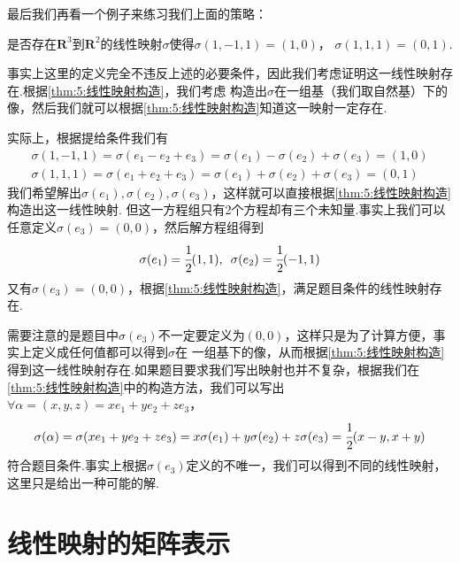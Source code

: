 最后我们再看一个例子来练习我们上面的策略：
\begin{example}\label{ex:5:线性映射判断2}
    是否存在$\mathbf{R}^3$到$\mathbf{R}^2$的线性映射$\sigma$使得$\sigma(1,-1,1)=(1,0)$，
	$\sigma(1,1,1)=(0,1)$.
\end{example}
\begin{solution}
    事实上这里的定义完全不违反上述的必要条件，因此我们考虑证明这一线性映射存在.根据\autoref{thm:5:线性映射构造}，我们考虑
    构造出$\sigma$在一组基（我们取自然基）下的像，然后我们就可以根据\autoref{thm:5:线性映射构造}知道这一映射一定存在.

    实际上，根据提给条件我们有
    \begin{gather*}
        \sigma(1,-1,1)=\sigma(e_1-e_2+e_3)=\sigma(e_1)-\sigma(e_2)+\sigma(e_3)=(1,0) \\
        \sigma(1,1,1)=\sigma(e_1+e_2+e_3)=\sigma(e_1)+\sigma(e_2)+\sigma(e_3)=(0,1)
    \end{gather*}
    我们希望解出$\sigma(e_1),\sigma(e_2),\sigma(e_3)$，这样就可以直接根据\autoref{thm:5:线性映射构造}构造出这一线性映射.
    但这一方程组只有2个方程却有三个未知量.事实上我们可以任意定义$\sigma(e_3)=(0,0)$，然后解方程组得到
    \[\sigma(e_1)=\cfrac{1}{2}(1,1),\enspace \sigma(e_2)=\cfrac{1}{2}(-1,1)\]
    又有$\sigma(e_3)=(0,0)$，根据\autoref{thm:5:线性映射构造}，满足题目条件的线性映射存在.
\end{solution}
需要注意的是题目中$\sigma(e_3)$不一定要定义为$(0,0)$，这样只是为了计算方便，事实上定义成任何值都可以得到$\sigma$在
一组基下的像，从而根据\autoref{thm:5:线性映射构造}得到这一线性映射存在.如果题目要求我们写出映射也并不复杂，根据我们在
\autoref{thm:5:线性映射构造}中的构造方法，我们可以写出$\forall\alpha=(x,y,z)=xe_1+ye_2+ze_3$，
\[\sigma(\alpha)=\sigma(xe_1+ye_2+ze_3)=x\sigma(e_1)+y\sigma(e_2)+z\sigma(e_3)=\cfrac{1}{2}(x-y,x+y)\]
符合题目条件.事实上根据$\sigma(e_3)$定义的不唯一，我们可以得到不同的线性映射，这里只是给出一种可能的解.

\section{线性映射的矩阵表示}
